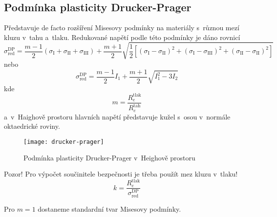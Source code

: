 
\subsection{Podmínka plasticity Drucker-Prager}\label{sec:drucker-prager}
Představuje de facto rozšíření Misesovy podmínky na materiály s~různou mezí kluzu v~tahu a~tlaku.
Redukované napětí podle této podmínky je dáno rovnicí
\begin{equation}
	\sigma_\text{red}^\text{DP}
	= \frac{m-1}{2} \left(\sigma_\text{I} + \sigma_\text{II} + \sigma_\text{III}\right)
	+ \frac{m+1}{2} \sqrt{\frac{1}{2} \left[ (\sigma_\text{I}-\sigma_\text{II})^2 + (\sigma_\text{I}-\sigma_\text{III})^2 + (\sigma_\text{II}-\sigma_\text{II})^2 \right]}
\end{equation}
nebo
\begin{equation}
	\sigma_\text{red}^\text{DP}
	= \frac{m-1}{2} I_1 + \frac{m+1}{2} \sqrt{I_1^2 - 3 I_2}
\end{equation}
kde
\begin{equation*}
	m = \frac{R_e^\text{tlak}}{R_e^\text{tah}}
\end{equation*}
a~v~Haighově prostoru hlavních napětí představuje kužel s~osou v~normále oktaedrické roviny.
\begin{figure}[h]
	\centering
	\texttt{[image: drucker-prager]}
	\caption{Podmínka plasticity Drucker-Prager v~Heighově prostoru}
	\label{fig:drucker-prager}
\end{figure}

Pozor! Pro výpočet součinitele bezpečnosti je třeba použít mez kluzu v~tlaku!
\begin{equation}
k = \frac{R_e^\text{tlak}}{\sigma_\text{red}^\text{DP}}
\end{equation}

Pro $m=1$ dostaneme standardní tvar Misesovy podmínky.
